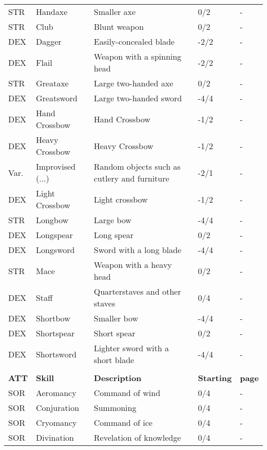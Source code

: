 \begin{center}
\begin{xltabular}{\textwidth}{l l X l l}
        STR & Handaxe & Smaller axe & 0/2 & - \\
        STR & Club & Blunt weapon & 0/2 & - \\
        DEX & Dagger & Easily-concealed blade & -2/2 & - \\
        DEX & Flail & Weapon with a spinning head & -2/2 & - \\ %
        STR & Greataxe & Large two-handed axe & 0/2 & - \\
        DEX & Greatsword & Large two-handed sword & -4/4 & - \\ %
        DEX & Hand Crossbow & Hand Crossbow & -1/2 & - \\
        DEX & Heavy Crossbow & Heavy Crossbow & -1/2 & - \\
        Var. & Improvised (...) & Random objects such as cutlery and furniture & -2/1 & - \\
        DEX & Light Crossbow & Light crossbow & -1/2 & - \\
        STR & Longbow & Large bow & -4/4 & - \\ %
        DEX & Longspear & Long spear & 0/2 & - \\
        DEX & Longsword & Sword with a long blade & -4/4 & - \\
        STR & Mace & Weapon with a heavy head & 0/2 & - \\ %
        DEX & Staff & Quarterstaves and other staves & 0/4 & - \\
        DEX & Shortbow & Smaller bow & -4/4 & - \\ %
        DEX & Shortspear & Short spear & 0/2 & - \\
        DEX & Shortsword & Lighter sword with a short blade & -4/4 & - \\
         \\*
        \textbf{ATT} & \textbf{Skill} & \textbf{Description} & \textbf{Starting} & \textbf{page} \\*
        SOR & Aeromancy & Command of wind & 0/4 & - \\
        SOR & Conjuration & Summoning & 0/4 & - \\
        SOR & Cryomancy & Command of ice & 0/4 & - \\
        SOR & Divination & Revelation of knowledge & 0/4 & - \\

\end{xltabular}
\end{center}
